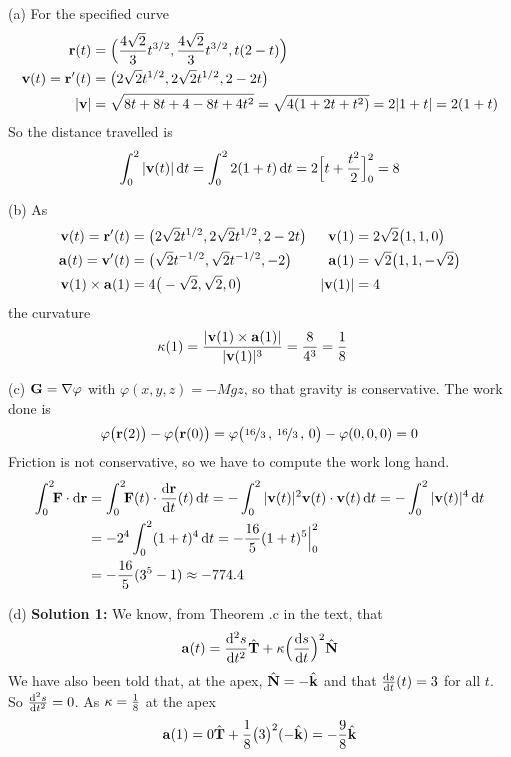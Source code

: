\begin{solution} (a)  
	For the specified curve
	\begin{align*}
	\mathbf{r}(t)&=\Big(\frac{4\sqrt{2}}{3}t^{3/2},\frac{4\sqrt{2}}{3}t^{3/2},
	t(2-t)\Big)\\
	\mathbf{v}(t)=\mathbf{r}'(t)&=\big(2\sqrt{2}t^{1/2},2\sqrt{2}t^{1/2},2-2t\big)\\
	|\mathbf{v}|&=\sqrt{8t+8t+4-8t+4t^2}=\sqrt{4(1+2t+t^2)}= 2|1+t|=2(1+t)
	\end{align*}
	So the distance travelled is 
	$$
	\int_0^2|\mathbf{v}(t)|\,\mathrm{d}t=\int_0^2 2(1+t)\,\mathrm{d}t = 2\Big[t+\frac{t^2}{2}\Big]_0^2
	=8
	$$
	
	(b) As
	\begin{align*}
	\mathbf{v}(t)=\mathbf{r}'(t)&=\big(2\sqrt{2}t^{1/2},2\sqrt{2}t^{1/2},2-2t\big) &
	\mathbf{v}(1)&=2\sqrt{2}\big(1,1,0\big)\\
	\mathbf{a}(t)=\mathbf{v}'(t)&=\big(\sqrt{2}t^{-1/2},\sqrt{2}t^{-1/2},-2\big) &
	\mathbf{a}(1)&=\sqrt{2}\big(1,1,-\sqrt{2}\big)\\
	\mathbf{v}(1)\times\mathbf{a}(1)&=4\big(-\sqrt{2},\sqrt{2},0\big) &
	|\mathbf{v}(1)|&=4
	\end{align*}
	the curvature
	\begin{align*}
	\kappa(1) &= \frac{|\mathbf{v}(1)\times\mathbf{a}(1)|}{|\mathbf{v}(1)|^3}
	=\frac{8}{4^3}
	=\frac{1}{8}
	\end{align*}
	
	(c) $\mathbf{G}=\nabla\varphi$ with $\varphi(x,y,z)= - Mgz$, so that gravity is conservative.
	The work done is 
	$$
	\varphi\big(\mathbf{r}(2)\big)-\varphi\big(\mathbf{r}(0)\big)
	=\varphi\big(\nicefrac{16}{3}\,,\,\nicefrac{16}{3}\,,\,0\big)
	-\varphi(0,0,0)=0
	$$
	Friction is not conservative, so we have to compute the work long hand.
	\begin{align*}
	\int_0^2\!\! \vF\cdot \dee{\vr} 
	&=\int_0^2\!\! \vF(t)\cdot \diff{\vr}{t}(t)\,\dee{t} 
	=-\int_0^2 |\vv(t)|^2\vv(t)\cdot \vv(t)\,\dee{t} 
	=-\int_0^2 |\vv(t)|^4\,\dee{t} \\
	&=-2^4\int_0^2 (1+t)^4\,\dee{t} 
	=-\frac{16}{5}(1+t)^5\Big|_0^2\\
	&=-\frac{16}{5}(3^5-1)\approx-774.4
	\end{align*}
	
	(d)	 \textbf{Solution 1:}\qquad
	We know, from Theorem .c in the 
	text, that
	\begin{equation*}
	\va(t)  = \difftwo{s}{t}\hat\vT + \ka\Big(\diff{s}{t}\Big)^2\hat\vN
	\end{equation*}
	We have also been told that, at the apex, $\hat{\mathbf{N}}=-\hat{\mathbf{k}}$ and 
	that $\diff{s}{t}(t)=3$ for all $t$.
	So $\difftwo{s}{t}=0$. As $\kappa=\frac{1}{8}$ at the apex
	\begin{equation*}
	\mathbf{a}(1)  = 0\hat{\mathbf{T}} + \frac{1}{8}\big(3\big)^2(-\hat{\mathbf{k}})
	= -\frac{9}{8}\hat{\mathbf{k}}
	\end{equation*}
	

\end{solution}
